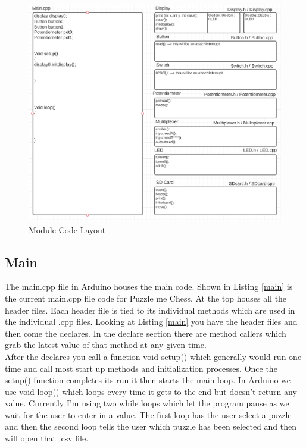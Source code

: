 \documentclass[11pt]{article}
\begin{document}
\begin{figure}
  \includegraphics[width=\linewidth]{./Pics/code_layout.PNG}
  \caption{Module Code Layout}
  \label{fig:MCL1}
\end{figure}

\subsection{Main}
The main.cpp file in Arduino houses the main code.  Shown in Listing \ref{main} is the current main.cpp file code for Puzzle me Chess. At the top houses all the header files. Each header file is tied to its individual methods which are used in the individual .cpp files. Looking at Listing \ref{main} you have the header files and then come the declares. In the declare section there are method callers which grab the latest value of that method at any given time.   
\\

\noindent After the declares you call a function void setup() which generally would run one time and call most start up methods and initialization processes. Once the setup() function completes its run it then starts the main loop. In Arduino we use void loop() which loops every time it gets to the end but doesn't return any value. Currently I'm using two while loops which let the program pause as we wait for the user to enter in a value. The  first loop has the user select a puzzle and then the second loop tells the user which puzzle has been selected and then will open that .csv file. 
\end{document}

